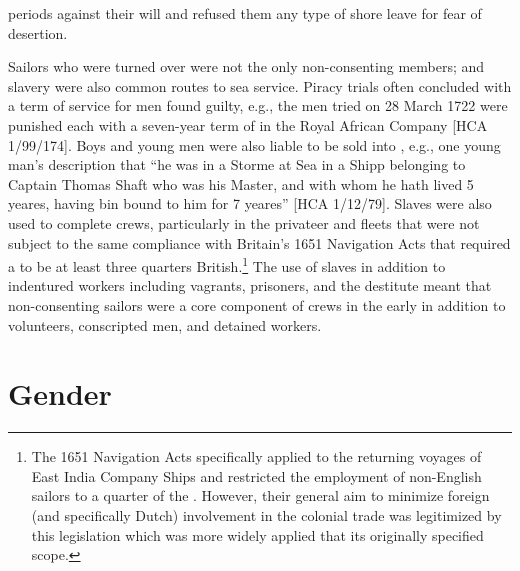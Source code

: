 periods against their will and refused them any type of shore leave for fear of desertion. 

Sailors who were turned over were not the only non-consenting  members;  and slavery were also common routes to sea service. Piracy trials often concluded with a term of service for men found guilty, e.g., the men tried on 28 March {1722} were punished each with a seven-year term of  in the Royal African Company [HCA 1/99/174]. Boys and young men were also liable to be sold into , e.g., one young man’s description that “he was in a Storme at Sea in a Shipp belonging to Captain Thomas Shaft who was his Master, and with whom he hath lived 5 yeares, having bin bound to him for 7 yeares” [HCA 1/12/79]. Slaves were also used to complete crews, particularly in the privateer and  fleets that were not subject to the same compliance with Britain's 1651 Navigation Acts that required a  to be at least three quarters British.\footnote{The {1651} Navigation Acts specifically applied to the returning voyages of East India Company Ships and restricted the employment of non-English sailors to a quarter of the . However, their general aim to minimize foreign (and specifically Dutch) involvement in the colonial trade was legitimized by this legislation which was more widely applied that its originally specified scope.} The use of slaves in addition to indentured workers including vagrants, prisoners, and the destitute meant that non-consenting sailors were a core component of crews in the early  in addition to volunteers, conscripted men, and detained workers. 
 
\section{{Gender}}\label{sec:3.3}

